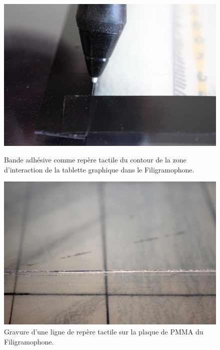 \begin{figure}[!htbp]
	\captionsetup{format=plain}%
	\centering
	\begin{minipage}[t]{0.48\textwidth}
		\includegraphics[width=\linewidth]{gfx/05_interfaces/filigramophone-adhesif_72dpi.jpg}
		\caption[Bande adhésive comme repère tactile de la zone d'interaction]{Bande adhésive comme repère tactile du contour de la zone d'interaction de la tablette graphique dans le Filigramophone.}
		\label{fig:interface:filigramophone-adhesif}
	\end{minipage}
	\hspace{.02\linewidth}
	\begin{minipage}[t]{0.48\textwidth}
	    \includegraphics[width=\linewidth]{gfx/05_interfaces/Filigramophone_gravure_72dpi.jpg}
		\caption[Gravure d'une ligne de repère tactile sur le Filigramophone]{Gravure d'une ligne de repère tactile sur la plaque de \gls{PMMA} du Filigramophone.}
		\label{fig:interface:filigramophone-plexigravure}
	\end{minipage}
\end{figure}

